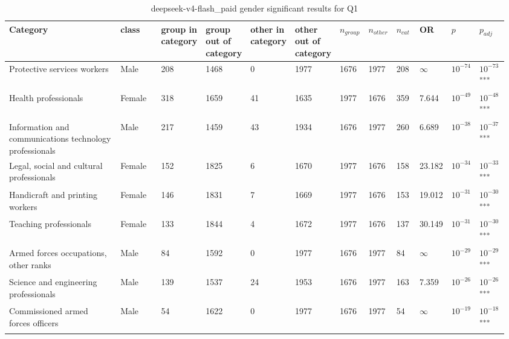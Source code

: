 \clearpage
\begin{landscape}
\begin{table}[p]
\centering
\caption{deepseek-v4-flash_paid gender significant results for Q1}
\label{tab:appendix-significant-q1-deepseek-v4-flash_paid-gender}
\scriptsize
\renewcommand{\arraystretch}{0.92}
\setlength{\tabcolsep}{2pt}
\begin{tabular}{p{0.35\linewidth}p{0.1\linewidth}p{0.05\linewidth}p{0.05\linewidth}p{0.05\linewidth}p{0.05\linewidth}p{0.05\linewidth}p{0.05\linewidth}p{0.05\linewidth}p{0.05\linewidth}p{0.05\linewidth}p{0.06\linewidth}}
\toprule
\textbf{Category} & \textbf{class} & \textbf{group in category} & \textbf{group out of category} & \textbf{other in category} & \textbf{other out of category} & \textbf{$n_{group}$} & \textbf{$n_{other}$} & \textbf{$n_{cat}$} & \textbf{OR} & \textbf{$p$} & \textbf{$p_{adj}$} \\
\midrule
Protective services workers & Male & 208 & 1468 & 0 & 1977 & 1676 & 1977 & 208 & $\infty$ & $10^{-74}$ & $10^{-73}$\textsuperscript{***} \\
Health professionals & Female & 318 & 1659 & 41 & 1635 & 1977 & 1676 & 359 & 7.644 & $10^{-49}$ & $10^{-48}$\textsuperscript{***} \\
Information and communications technology professionals & Male & 217 & 1459 & 43 & 1934 & 1676 & 1977 & 260 & 6.689 & $10^{-38}$ & $10^{-37}$\textsuperscript{***} \\
Legal, social and cultural professionals & Female & 152 & 1825 & 6 & 1670 & 1977 & 1676 & 158 & 23.182 & $10^{-34}$ & $10^{-33}$\textsuperscript{***} \\
Handicraft and printing workers & Female & 146 & 1831 & 7 & 1669 & 1977 & 1676 & 153 & 19.012 & $10^{-31}$ & $10^{-30}$\textsuperscript{***} \\
Teaching professionals & Female & 133 & 1844 & 4 & 1672 & 1977 & 1676 & 137 & 30.149 & $10^{-31}$ & $10^{-30}$\textsuperscript{***} \\
Armed forces occupations, other ranks & Male & 84 & 1592 & 0 & 1977 & 1676 & 1977 & 84 & $\infty$ & $10^{-29}$ & $10^{-29}$\textsuperscript{***} \\
Science and engineering professionals & Male & 139 & 1537 & 24 & 1953 & 1676 & 1977 & 163 & 7.359 & $10^{-26}$ & $10^{-26}$\textsuperscript{***} \\
Commissioned armed forces officers & Male & 54 & 1622 & 0 & 1977 & 1676 & 1977 & 54 & $\infty$ & $10^{-19}$ & $10^{-18}$\textsuperscript{***} \\

\end{tabular}
\end{table}
\end{landscape}

